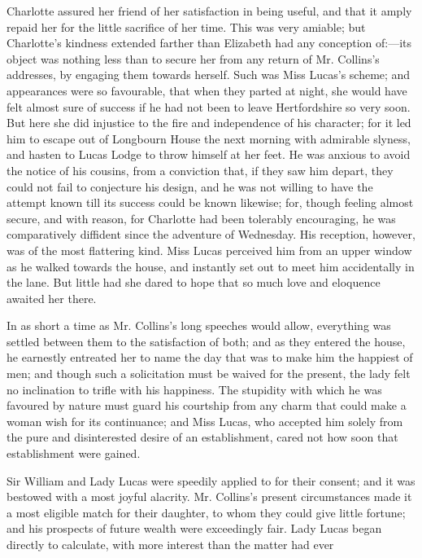 \documentclass[12pt]{book}
\begin{document}
Charlotte assured her friend of her satisfaction in being useful, and that it amply repaid her for the little sacrifice of her time. This was very amiable; but Charlotte's kindness extended farther than Elizabeth had any conception of:---its object was nothing less than to secure her from any return of Mr. Collins's addresses, by engaging them towards herself. Such was Miss Lucas's scheme; and appearances were so favourable, that when they parted at night, she would have felt almost sure of success if he had not been to leave Hertfordshire so very soon. But here she did injustice to the fire and independence of his character; for it led him to escape out of Longbourn House the next morning with admirable slyness, and hasten to Lucas Lodge to throw himself at her feet. He was anxious to avoid the notice of his cousins, from a conviction that, if they saw him depart, they could not fail to conjecture his design, and he was not willing to have the attempt known till its success could be known likewise; for, though feeling almost secure, and with reason, for Charlotte had been tolerably encouraging, he was comparatively diffident since the adventure of Wednesday. His reception, however, was of the most flattering kind. Miss Lucas perceived him from an upper window as he walked towards the house, and instantly set out to meet him accidentally in the lane. But little had she dared to hope that so much love and eloquence awaited her there.

In as short a time as Mr. Collins's long speeches would allow, everything was settled between them to the satisfaction of both; and as they entered the house, he earnestly entreated her to name the day that was to make him the happiest of men; and though such a solicitation must be waived for the present, the lady felt no inclination to trifle with his happiness. The stupidity with which he was favoured by nature must guard his courtship from any charm that could make a woman wish for its continuance; and Miss Lucas, who accepted him solely from the pure and disinterested desire of an establishment, cared not how soon that establishment were gained.

Sir William and Lady Lucas were speedily applied to for their consent; and it was bestowed with a most joyful alacrity. Mr. Collins's present circumstances made it a most eligible match for their daughter, to whom they could give little fortune; and his prospects of future wealth were exceedingly fair. Lady Lucas began directly to calculate, with more interest than the matter had ever
\end{document}
